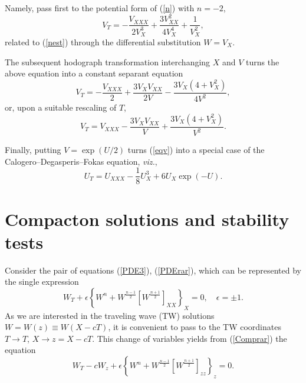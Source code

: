 \documentclass[12pt]{article}
\begin{document}
Namely, pass first to the potential form of (\ref{n}) with $n=-2$,
\[
V_T=-\frac{V_{XXX}}{2 V_X^3}+\frac{3 V_{XX}^2}{4 V_X^4}+\frac{1}{V_X^2},
\]
related to (\ref{nest}) through the differential substitution $W=V_X$.

The subsequent hodograph transformation interchanging $X$ and $V$
turns the above equation into a constant separant equation
\[
V_T=-\frac{V_{XXX}}{2}+\frac{3 V_X V_{XX}}{2 V}-\frac{3 V_X (4+V_X^2)}{4 V^2},
\]
or, upon a suitable rescaling of $T$,
\begin{equation}\label{eqv}
V_T=V_{XXX}-\frac{3 V_X V_{XX}}{V}+\frac{3 V_X (4+V_X^2)}{V^2}.
\end{equation}

Finally, putting $V=\exp(U/2)$ turns (\ref{eqv}) into a special case of the Calogero--Degasperis--Fokas \cite{cd, f} equation, {\em viz.},
\begin{equation}\label{cdf}
U_T=U_{XXX}-\frac18 U_{X}^3+6 U_X\exp(-U).
\end{equation}










\section{Compacton solutions and stability tests}\label{vs:sec3}


Consider the pair of equations (\ref{PDE3}), (\ref{PDErar}), which can be represented by the single expression
\begin{equation}\label{Comprar}
W_{ T}+\epsilon \left\{W^n+ W^\frac{n-1}{2} \left[W^\frac{n+1}{2}  \right]_{XX}  \right\}_{X}=0, \quad \epsilon=\pm 1.
\end{equation}
As we are interested in the traveling wave (TW) solutions $W=W(z)\equiv W(X-c T)$,  it is convenient
to
pass to the TW coordinates  $T\to T$, $X\to z=X-c T$. This change of variables yields from (\ref{Comprar}) the equation
\begin{equation}\label{PDE3C}
W_{T}-c W_{ z}+\epsilon \left\{W^n+ W^\frac{n-1}{2} \left[W^\frac{n+1}{2}  \right]_{zz}  \right\}_{z}=0.
\end{equation}
\end{document}
